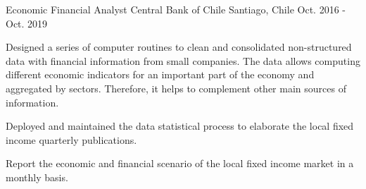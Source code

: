 \begin{cventries}
  \cventry
    {Economic Financial Analyst} %
    {Central Bank of Chile} %
    {Santiago, Chile} %
    {Oct. 2016 - Oct. 2019} %
    {
      \begin{cvitems} %
        \item {Designed a series of computer routines to clean and consolidated non-structured data with financial information from small companies. The data allows computing different economic indicators for an important part of the economy and aggregated by sectors. Therefore, it helps to complement other main sources of information.}
        \item {Deployed and maintained the data statistical process to elaborate the local fixed income quarterly publications.}
        \item {Report the economic and financial scenario of the local fixed income market in a monthly basis.}
      \end{cvitems}
    }

\end{cventries}
